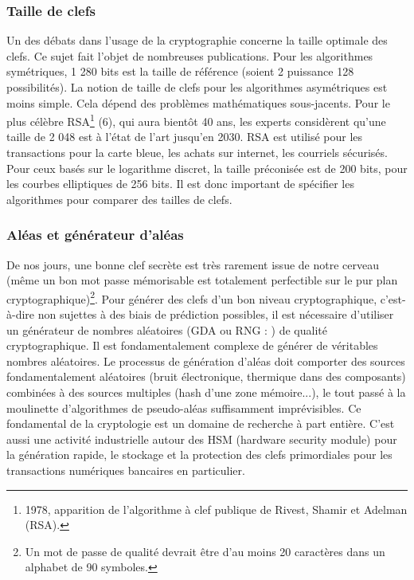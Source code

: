 \subsubsection{Taille de clefs}
Un des débats dans l'usage de la cryptographie concerne la taille optimale des clefs. Ce sujet fait l'objet de nombreuses publications. Pour les algorithmes symétriques, 1 280 bits est la taille de référence (soient 2 puissance 128 possibilités). La notion de taille de clefs pour les algorithmes asymétriques est moins simple. Cela dépend des problèmes mathématiques sous-jacents. Pour le plus célèbre RSA\footnote{1978, apparition de l'algorithme à clef publique de Rivest, Shamir et Adelman (RSA).} (6), qui aura bientôt 40 ans, les experts considèrent qu'une taille de 2 048 est à l'état de l'art jusqu'en 2030. RSA est utilisé pour les transactions pour la carte bleue, les achats sur internet, les courriels sécurisés. Pour ceux basés sur le logarithme discret, la taille préconisée est de 200 bits, pour les courbes elliptiques de 256 bits. Il est donc important de spécifier les algorithmes pour comparer des tailles de clefs.
\subsubsection{Aléas et générateur d'aléas}
De nos jours, une bonne clef secrète est très rarement issue de notre cerveau (même un bon mot passe mémorisable est totalement perfectible sur le pur plan cryptographique)\footnote{Un mot de passe de qualité devrait être d'au moins 20 caractères dans un alphabet de 90 symboles.}. Pour générer des clefs d'un bon niveau cryptographique, c'est-à-dire non sujettes à des biais de prédiction possibles, il est nécessaire d'utiliser un générateur de nombres aléatoires (GDA ou RNG : ) de qualité cryptographique. Il est fondamentalement complexe de générer de véritables nombres aléatoires. Le processus de génération d'aléas doit comporter des sources fondamentalement aléatoires (bruit électronique, thermique dans des composants) combinées à des sources multiples (hash d'une zone mémoire...), le tout passé à la moulinette d'algorithmes de pseudo-aléas suffisamment imprévisibles. Ce fondamental de la cryptologie est un domaine de recherche à part entière. C'est aussi une activité industrielle autour des HSM (hardware security module) pour la génération rapide, le stockage et la protection des clefs primordiales pour les transactions numériques bancaires en particulier.
